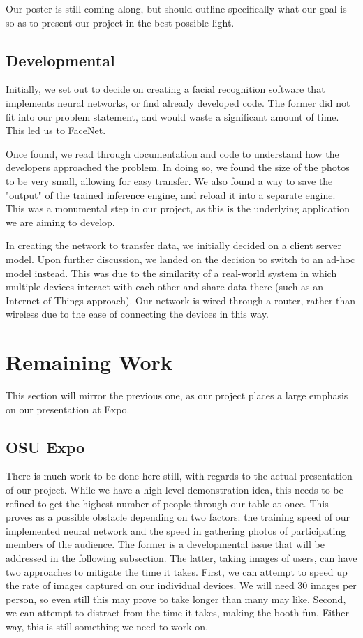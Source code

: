 \documentclass[onecolumn, draftclsnofoot,10pt, compsoc]{IEEEtran}
\begin{document}
    Our poster is still coming along, but should outline specifically what our goal is so as to present our project in the best possible light.

    \subsection{Developmental}
    Initially, we set out to decide on creating a facial recognition software that implements neural networks, or find already developed code. 
    The former did not fit into our problem statement, and would waste a significant amount of time. This led us to FaceNet.

    Once found, we read through documentation and code to understand how the developers approached the problem. In doing so, we found the size of the photos to be very small, allowing for easy transfer. We also found a way to save the "output" of the trained inference engine, and reload it into a separate engine. This was a monumental step in our project, as this is the underlying application we are aiming to develop.

    In creating the network to transfer data, we initially decided on a client server model. Upon further discussion, we landed on the decision to switch to an ad-hoc model instead. This was due to the similarity of a real-world system in which multiple devices interact with each other and share data there (such as an Internet of Things approach). Our network is wired through a router, rather than wireless due to the ease of connecting the devices in this way.

\section{Remaining Work}
This section will mirror the previous one, as our project places a large emphasis on our presentation at Expo.

    \subsection{OSU Expo}
    There is much work to be done here still, with regards to the actual presentation of our project. While we have a high-level demonstration idea, this needs to be refined to get the highest number of people through our table at once. This proves as a possible obstacle depending on two factors: the training speed of our implemented neural network and the speed in gathering photos of participating members of the audience. The former is a developmental issue that will be addressed in the following subsection. The latter, taking images of users, can have two approaches to mitigate the time it takes. First, we can attempt to speed up the rate of images captured on our individual devices. We will need 30 images per person, so even still this may prove to take longer than many may like. Second, we can attempt to distract from the time it takes, making the booth fun. Either way, this is still something we need to work on. 
    
\end{document}
